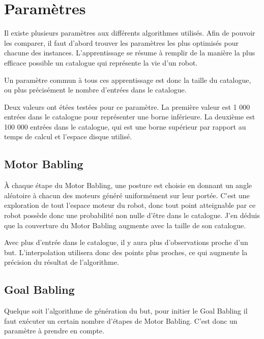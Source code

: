 \documentclass[11pt,french]{report}
\begin{document}
\pagebreak

\section{Paramètres}

Il existe plusieurs paramètres aux différents algorithmes utilisés.
Afin de pouvoir les comparer, il faut d'abord trouver les paramètres les plus optimisés pour chacune des instances.
L'apprentissage se résume à remplir de la manière la plus efficace possible un catalogue qui représente la vie d'un robot.

\phantom{INVISIBLE LINE}

Un paramètre commun à tous ces apprentissage est donc la taille du catalogue, ou plus précisément le nombre d'entrées dans le catalogue.

Deux valeurs ont étées testées pour ce paramètre.
La première valeur est 1 000 entrées dans le catalogue pour représenter une borne inférieure.
La deuxième est 100 000 entrées dans le catalogue, qui est une borne supérieur par rapport au temps de calcul et l'espace disque utilisé.

\subsection{Motor Babling}

\`A chaque étape du Motor Babling, une posture est choisie en donnant un angle aléatoire à chacun des moteurs généré uniformément sur leur portée.
C'est une exploration de tout l'espace moteur du robot, donc tout point atteignable par ce robot possède donc une probabilité non nulle d'être dans le catalogue.
J'en déduis que la couverture du Motor Babling augmente avec la taille de son catalogue.

Avec plus d'entrée dans le catalogue, il y aura plus d'observations proche d'un but. L'interpolation utilisera donc des points plus proches, ce qui augmente la précision du résultat de l'algorithme.

\subsection{Goal Babling}

Quelque soit l'algorithme de génération du but, pour initier le Goal Babling il faut exécuter un certain nombre d'étapes de Motor Babling.
C'est donc un paramètre à prendre en compte.
\end{document}
